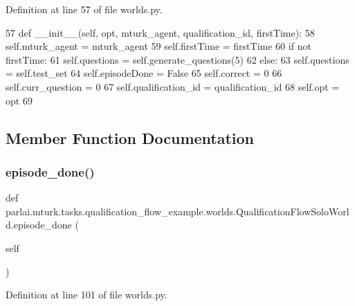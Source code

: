 Definition at line 57 of file worlds.\+py.


\begin{DoxyCode}
57     \textcolor{keyword}{def }\_\_init\_\_(self, opt, mturk\_agent, qualification\_id, firstTime):
58         self.mturk\_agent = mturk\_agent
59         self.firstTime = firstTime
60         \textcolor{keywordflow}{if} \textcolor{keywordflow}{not} firstTime:
61             self.questions = self.generate\_questions(5)
62         \textcolor{keywordflow}{else}:
63             self.questions = self.test\_set
64         self.episodeDone = \textcolor{keyword}{False}
65         self.correct = 0
66         self.curr\_question = 0
67         self.qualification\_id = qualification\_id
68         self.opt = opt
69 
\end{DoxyCode}


\subsection{Member Function Documentation}
\mbox{\label{classparlai_1_1mturk_1_1tasks_1_1qualification__flow__example_1_1worlds_1_1QualificationFlowSoloWorld_a59a02d55f0eeffb3e4d6710c443db3e8}} 
\subsubsection{\texorpdfstring{episode\+\_\+done()}{episode\_done()}}
{\footnotesize\ttfamily def parlai.\+mturk.\+tasks.\+qualification\+\_\+flow\+\_\+example.\+worlds.\+Qualification\+Flow\+Solo\+World.\+episode\+\_\+done (\begin{DoxyParamCaption}\item[{}]{self }\end{DoxyParamCaption})}



Definition at line 101 of file worlds.\+py.


